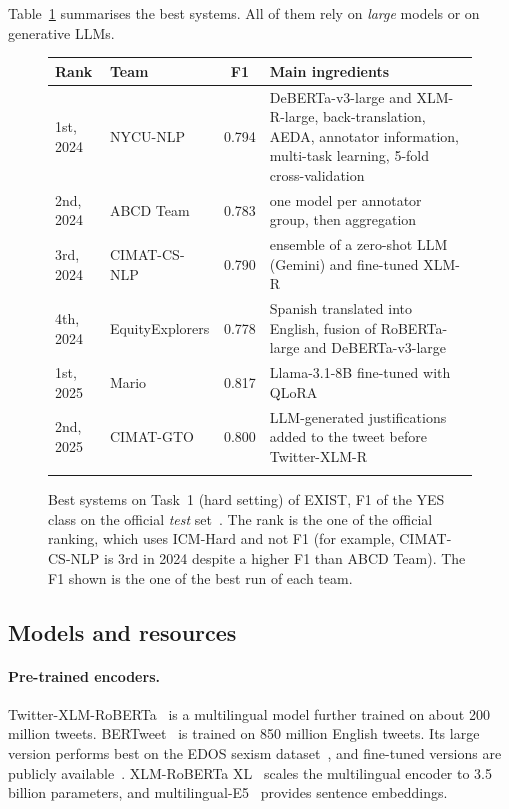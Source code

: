 \documentclass[pdflatex,sn-mathphys-num]{sn-jnl}
\makeatletter
\newenvironment{Htable}{\begin{figure}[H]\def\@captype{table}\begin{center}\begin{threeparttable}\tablebodyfont}{\end{threeparttable}\end{center}\end{figure}}
\makeatother
\begin{document}
Table~\ref{tab:top} summarises the best systems. All of them rely on \emph{large} models or on generative LLMs.

\begin{Htable}
\caption{Best systems on Task~1 (hard setting) of EXIST, F1 of the YES class on the official \emph{test} set~\cite{plaza2024exist,plaza2025exist}. The rank is the one of the official ranking, which uses ICM-Hard and not F1 (for example, CIMAT-CS-NLP is 3rd in 2024 despite a higher F1 than ABCD Team). The F1 shown is the one of the best run of each team.}\label{tab:top}
\begin{tabularx}{\textwidth}{@{}llcX@{}}
\toprule
Rank & Team & F1 & Main ingredients \\
\midrule
1st, 2024 & NYCU-NLP~\cite{fang2024nycu} & 0.794 & DeBERTa-v3-large and XLM-R-large, back-translation, AEDA, annotator information, multi-task learning, 5-fold cross-validation \\
2nd, 2024 & ABCD Team & 0.783 & one model per annotator group, then aggregation \\
3rd, 2024 & CIMAT-CS-NLP & 0.790 & ensemble of a zero-shot LLM (Gemini) and fine-tuned XLM-R \\
4th, 2024 & EquityExplorers & 0.778 & Spanish translated into English, fusion of RoBERTa-large and DeBERTa-v3-large \\
1st, 2025 & Mario~\cite{mario2025} & 0.817 & Llama-3.1-8B fine-tuned with QLoRA \\
2nd, 2025 & CIMAT-GTO~\cite{cimat2025knowledge} & 0.800 & LLM-generated justifications added to the tweet before Twitter-XLM-R \\
\botrule
\end{tabularx}
\end{Htable}

\subsection{Models and resources}

\paragraph{Pre-trained encoders.} Twitter-XLM-RoBERTa~\cite{barbieri2022xlmt} is a multilingual model further trained on about 200 million tweets. BERTweet~\cite{nguyen2020bertweet} is trained on 850 million English tweets. Its large version performs best on the EDOS sexism dataset~\cite{alazzawi2023nlpltu,kirk2023edos}, and fine-tuned versions are publicly available~\cite{nlpltu_model}. XLM-RoBERTa XL~\cite{goyal2021xlmrxl} scales the multilingual encoder to 3.5 billion parameters, and multilingual-E5~\cite{wang2024e5} provides sentence embeddings.
\end{document}
